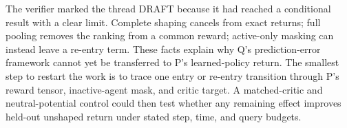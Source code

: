 \documentclass{article}
\begin{document}
The verifier marked the thread DRAFT because it had reached a conditional result with a clear limit. Complete
shaping cancels from exact returns; full pooling removes the ranking from a common reward; active-only masking
can instead leave a re-entry term. These facts explain why Q's prediction-error framework cannot yet be
transferred to P's learned-policy return. The smallest step to restart the work is to trace one entry or
re-entry transition through P's reward tensor, inactive-agent mask, and critic target. A matched-critic and
neutral-potential control could then test whether any remaining effect improves held-out unshaped return under
stated step, time, and query budgets.



\end{document}
